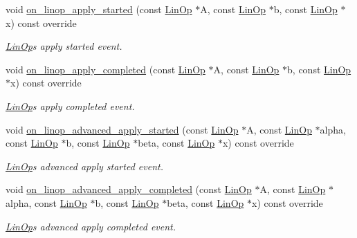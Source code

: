 \begin{DoxyCompactItemize}
void \hyperlink{classgko_1_1log_1_1Stream_a53ec3188b8113d894b09310867047605}{on\+\_\+linop\+\_\+apply\+\_\+started} (const \hyperlink{classgko_1_1LinOp}{Lin\+Op} $\ast$A, const \hyperlink{classgko_1_1LinOp}{Lin\+Op} $\ast$b, const \hyperlink{classgko_1_1LinOp}{Lin\+Op} $\ast$x) const override
\begin{DoxyCompactList}\small\item\em \hyperlink{classgko_1_1LinOp}{Lin\+Op}\textquotesingle{}s apply started event. \end{DoxyCompactList}\item 
void \hyperlink{classgko_1_1log_1_1Stream_a9b1bb3ea948704d2397fe03f4ab83cab}{on\+\_\+linop\+\_\+apply\+\_\+completed} (const \hyperlink{classgko_1_1LinOp}{Lin\+Op} $\ast$A, const \hyperlink{classgko_1_1LinOp}{Lin\+Op} $\ast$b, const \hyperlink{classgko_1_1LinOp}{Lin\+Op} $\ast$x) const override
\begin{DoxyCompactList}\small\item\em \hyperlink{classgko_1_1LinOp}{Lin\+Op}\textquotesingle{}s apply completed event. \end{DoxyCompactList}\item 
void \hyperlink{classgko_1_1log_1_1Stream_ae5baeb37b33440aceab376116b8ee57f}{on\+\_\+linop\+\_\+advanced\+\_\+apply\+\_\+started} (const \hyperlink{classgko_1_1LinOp}{Lin\+Op} $\ast$A, const \hyperlink{classgko_1_1LinOp}{Lin\+Op} $\ast$alpha, const \hyperlink{classgko_1_1LinOp}{Lin\+Op} $\ast$b, const \hyperlink{classgko_1_1LinOp}{Lin\+Op} $\ast$beta, const \hyperlink{classgko_1_1LinOp}{Lin\+Op} $\ast$x) const override
\begin{DoxyCompactList}\small\item\em \hyperlink{classgko_1_1LinOp}{Lin\+Op}\textquotesingle{}s advanced apply started event. \end{DoxyCompactList}\item 
void \hyperlink{classgko_1_1log_1_1Stream_a2eac89ee661a046813374f1103ebd32e}{on\+\_\+linop\+\_\+advanced\+\_\+apply\+\_\+completed} (const \hyperlink{classgko_1_1LinOp}{Lin\+Op} $\ast$A, const \hyperlink{classgko_1_1LinOp}{Lin\+Op} $\ast$alpha, const \hyperlink{classgko_1_1LinOp}{Lin\+Op} $\ast$b, const \hyperlink{classgko_1_1LinOp}{Lin\+Op} $\ast$beta, const \hyperlink{classgko_1_1LinOp}{Lin\+Op} $\ast$x) const override
\begin{DoxyCompactList}\small\item\em \hyperlink{classgko_1_1LinOp}{Lin\+Op}\textquotesingle{}s advanced apply completed event. \end{DoxyCompactList}\item 

\end{DoxyCompactItemize}
